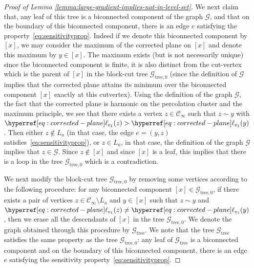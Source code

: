 \documentclass[12pt]{amsart}
\numberwithin{equation}{section}
\begin{document}
\begin{proof}[Proof of Lemma \ref{lemma:large-gradient-implies-not-in-level-set}]
		We next claim that, any leaf of this tree is a biconnected component of the graph $\mathcal{G}$, and that on the boundary of this biconnected component, there is an edge $e$ satisfying the property~\eqref{eq:sensitivityprop}. Indeed if we denote this biconnected component by $[x]$, we may consider the maximum of the corrected plane on $[x]$ and denote this maximum by $y \in [x]$. The maximum exists (but is not necessarily unique) since the biconnected component is finite, it is also distinct from the cut-vertex which is the parent of $[x]$ in the block-cut tree $\mathcal{G}_{\mathrm{tree},0}$ (since the definition of $\mathcal{G}$ implies that the corrected plane attains its minimum over the biconnected component $[x]$ exactly at this cutvertex). Using the definition of the graph $\mathcal{G}$, the fact that the corrected plane is harmonic on the percolation cluster and the maximum principle, we see that there exists a vertex $z \in \mathscr{C}_\infty$ such that $z \sim y$ with $\ellp{e_1} (z) > \ellp{e_1} (y)$. Then either $z \notin L_a$ (in that case, the edge $e = (y , z)$ satisfies~\eqref{eq:sensitivityprop}), or $z \in L_a$, in that case, the definition of the graph $\mathcal{G}$ implies that $z \in \mathcal{G}$. Since $z \notin [x]$ and since $[x]$ is a leaf, this implies that there is a loop in the tree $\mathcal{G}_{\mathrm{tree},0}$ which is a contradiction.
		
		We next modify the block-cut tree $\mathcal{G}_{\mathrm{tree},0}$ by removing some vertices according to the following procedure: for any biconnected component $[x] \in \mathcal{G}_{\mathrm{tree},0}$, if there exists a pair of vertices $z \in \mathscr{C}_\infty \setminus L_a$ and $y \in [x]$ such that $z \sim y$ and $\ellp{e_1}(z) \neq \ellp{e_1}(y)$, then we erase all the descendants of $[x]$ in the tree $\mathcal{G}_{\mathrm{tree},0}$. We denote the graph obtained through this procedure by $\mathcal{G}_{\mathrm{tree}}$. We note that the tree $\mathcal{G}_{\mathrm{tree}}$ satisfies the same property as the tree $\mathcal{G}_{\mathrm{tree},0}$: any leaf of $\mathcal{G}_{\mathrm{tree}}$ is a biconnected component and on the boundary of this biconnected component, there is an edge $e$ satisfying the sensitivity property~\eqref{eq:sensitivityprop}.
		\medskip
		

\end{proof}
\end{document}
